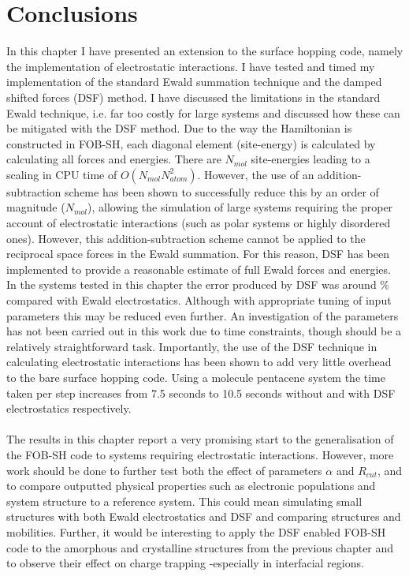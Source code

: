 
\section{Conclusions}
In this chapter I have presented an extension to the surface hopping code, namely the implementation of electrostatic interactions. I have tested and timed my implementation of the standard Ewald summation technique and the damped shifted forces (DSF) method. I have discussed the limitations in the standard Ewald technique, i.e. far too costly for large systems and discussed how these can be mitigated with the DSF method. Due to the way the Hamiltonian is constructed in FOB-SH, each diagonal element (site-energy) is calculated by calculating all forces and energies. There are $N_{mol}$ site-energies leading to a scaling in CPU time of $O(N_{mol} N_{atom}^2)$. However, the use of an addition-subtraction scheme has been shown to successfully reduce this by an order of magnitude ($N_{mol}$), allowing the simulation of large systems requiring the proper account of electrostatic interactions (such as polar systems or highly disordered ones). However, this addition-subtraction scheme cannot be applied to the reciprocal space forces in the Ewald summation. For this reason, DSF has been implemented to provide a reasonable estimate of full Ewald forces and energies. In the systems tested in this chapter the error produced by DSF was around \% compared with Ewald electrostatics. Although with appropriate tuning of input parameters this may be reduced even further. An investigation of the parameters has not been carried out in this work due to time constraints, though should be a relatively straightforward task. Importantly, the use of the DSF technique in calculating electrostatic interactions has been shown to add very little overhead to the bare surface hopping code. Using a  molecule pentacene system the time taken per step increases from 7.5 seconds to 10.5 seconds without and with DSF electrostatics respectively.
\\\\
The results in this chapter report a very promising start to the generalisation of the FOB-SH code to systems requiring electrostatic interactions. However, more work should be done to further test both the effect of parameters $\alpha$ and $R_{cut}$, and to compare outputted physical properties such as electronic populations and system structure to a reference system. This could mean simulating small  structures with both Ewald electrostatics and DSF and comparing structures and mobilities. Further, it would be interesting to apply the DSF enabled FOB-SH code to the amorphous and crystalline structures from the previous chapter and to observe their effect on charge trapping -especially in interfacial regions.

